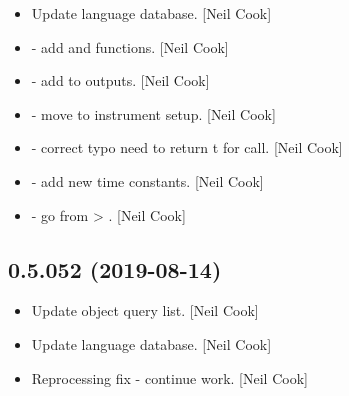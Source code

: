 \documentclass[a4paper,10pt,english]{report}
\begin{document}
\begin{itemize}
\item {} 
Update language database. {[}Neil Cook{]}

\item {} 
 - add  and  functions.
{[}Neil Cook{]}

\item {} 
 - add  to
outputs. {[}Neil Cook{]}

\item {} 
 - move  to instrument
setup. {[}Neil Cook{]}

\item {} 
 - correct typo need to return t for 
call. {[}Neil Cook{]}

\item {} 
 - add new time constants. {[}Neil Cook{]}

\item {} 
 - go from  \textendash{}\textgreater{} . {[}Neil Cook{]}

\end{itemize}


\subsection{0.5.052 (2019-08-14)}
\label{\detokenize{misc/changelog:id91}}\begin{itemize}
\item {} 
Update object query list. {[}Neil Cook{]}

\item {} 
Update language database. {[}Neil Cook{]}

\item {} 
Reprocessing fix - continue work. {[}Neil Cook{]}

\end{itemize}
\end{document}
